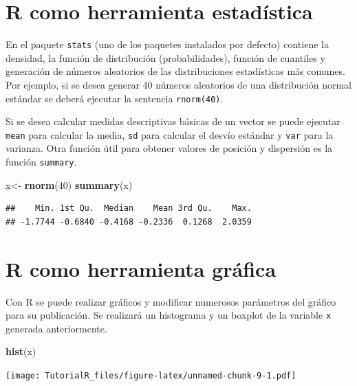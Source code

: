\documentclass[]{book}
\newenvironment{Shaded}{\begin{snugshade}}{\end{snugshade}}
\newcommand{\KeywordTok}[1]{\textcolor[rgb]{0.13,0.29,0.53}{\textbf{#1}}}
\newcommand{\DecValTok}[1]{\textcolor[rgb]{0.00,0.00,0.81}{#1}}
\newcommand{\StringTok}[1]{\textcolor[rgb]{0.31,0.60,0.02}{#1}}
\newcommand{\NormalTok}[1]{#1}
\begin{document}
\section{R como herramienta
estadística}\label{r-como-herramienta-estadistica}

En el paquete \texttt{stats} (uno de los paquetes instalados por
defecto) contiene la densidad, la función de distribución
(probabilidades), función de cuantiles y generación de números
aleatorios de las distribuciones estadísticas más comunes. Por ejemplo,
si se desea generar 40 números aleatorios de una distribución normal
estándar se deberá ejecutar la sentencia \texttt{rnorm(40)}.

Si se desea calcular medidas descriptivas básicas de un vector se puede
ejecutar \texttt{mean} para calcular la media, \texttt{sd} para calcular
el desvío estándar y \texttt{var} para la varianza. Otra función útil
para obtener valores de posición y dispersión es la función
\texttt{summary}.

\begin{Shaded}
\begin{Highlighting}[]
\NormalTok{x<-}\StringTok{ }\KeywordTok{rnorm}\NormalTok{(}\DecValTok{40}\NormalTok{)}
\KeywordTok{summary}\NormalTok{(x)}
\end{Highlighting}
\end{Shaded}

\begin{verbatim}
##    Min. 1st Qu.  Median    Mean 3rd Qu.    Max. 
## -1.7744 -0.6840 -0.4168 -0.2336  0.1268  2.0359
\end{verbatim}

\section{R como herramienta gráfica}\label{r-como-herramienta-grafica}

Con R se puede realizar gráficos y modificar numerosos parámetros del
gráfico para su publicación. Se realizará un histograma y un boxplot de
la variable \texttt{x} generada anteriormente.

\begin{Shaded}
\begin{Highlighting}[]
\KeywordTok{hist}\NormalTok{(x)}
\end{Highlighting}
\end{Shaded}

\texttt{[image: TutorialR\_files/figure-latex/unnamed-chunk-9-1.pdf]}
\end{document}
